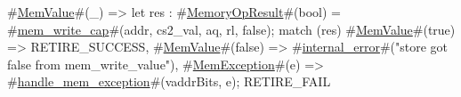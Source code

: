{{{{        #\hyperref[sailRISCVzMemValue]{MemValue}#(_) => {
          let res : #\hyperref[sailRISCVzMemoryOpResult]{MemoryOpResult}#(bool) = #\hyperref[sailRISCVzmemzywritezycap]{mem\_write\_cap}#(addr, cs2_val, aq, rl, false);
          match (res) {
            #\hyperref[sailRISCVzMemValue]{MemValue}#(true)  => RETIRE_SUCCESS,
            #\hyperref[sailRISCVzMemValue]{MemValue}#(false) => #\hyperref[sailRISCVzinternalzyerror]{internal\_error}#("store got false from mem_write_value"),
            #\hyperref[sailRISCVzMemException]{MemException}#(e) => { #\hyperref[sailRISCVzhandlezymemzyexception]{handle\_mem\_exception}#(vaddrBits, e); RETIRE_FAIL }
          }
        }
      }
    }
  }
}
